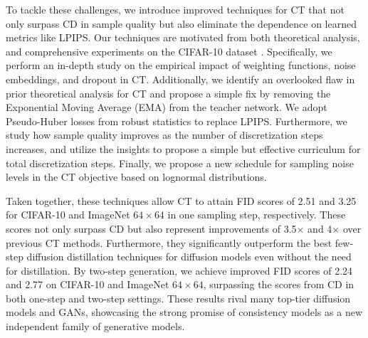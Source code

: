 To tackle these challenges, we introduce improved techniques for CT that not only surpass CD in sample quality but also eliminate the dependence on learned metrics like LPIPS. Our techniques are motivated from both theoretical analysis, and comprehensive experiments on the CIFAR-10 dataset \citep{krizhevsky2014cifar}. Specifically, we perform an in-depth study on the empirical impact of weighting functions, noise embeddings, and dropout in CT. Additionally, we identify an overlooked flaw in prior theoretical analysis for CT and propose a simple fix by removing the Exponential Moving Average (EMA) from the teacher network. We adopt Pseudo-Huber losses from robust statistics to replace LPIPS. Furthermore, we study how sample quality improves as the number of discretization steps increases, and utilize the insights to propose a simple but effective curriculum for total discretization steps. Finally, we propose a new schedule for sampling noise levels in the CT objective based on lognormal distributions.

Taken together, these techniques allow CT to attain FID scores of 2.51 and 3.25 for CIFAR-10 and ImageNet $64\times 64$ in one sampling step, respectively. These scores not only surpass CD but also represent improvements of 3.5$\times$ and 4$\times$ over previous CT methods. Furthermore, they significantly outperform the best few-step diffusion distillation techniques for diffusion models even without the need for distillation. By two-step generation, we achieve improved FID scores of 2.24 and 2.77 on CIFAR-10 and ImageNet $64\times 64$, surpassing the scores from CD in both one-step and two-step settings. These results rival many top-tier diffusion models and GANs, showcasing the strong promise of consistency models as a new independent family of generative models.
